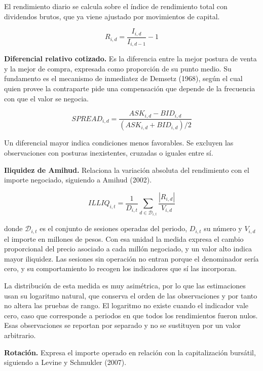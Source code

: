 El rendimiento diario se calcula sobre el índice de rendimiento total con dividendos brutos, que ya viene ajustado por movimientos de capital.

\begin{equation}R_{i,d} = \frac{I_{i,d}}{I_{i,d - 1}} - 1\tag{4}\end{equation}

\textbf{Diferencial relativo cotizado.} Es la diferencia entre la mejor postura de venta y la mejor de compra, expresada como proporción de su punto medio. Su fundamento es el mecanismo de inmediatez de Demsetz (1968), según el cual quien provee la contraparte pide una compensación que depende de la frecuencia con que el valor se negocia.

\begin{equation}SPREAD_{i,d} = \frac{ASK_{i,d} - BID_{i,d}}{\left( ASK_{i,d} + BID_{i,d} \right)/2}\tag{5}\end{equation}

Un diferencial mayor indica condiciones menos favorables. Se excluyen las observaciones con posturas inexistentes, cruzadas o iguales entre sí.

\textbf{Iliquidez de Amihud.} Relaciona la variación absoluta del rendimiento con el importe negociado, siguiendo a Amihud (2002).

\begin{equation}ILLIQ_{i,t} = \frac{1}{D_{i,t}}\sum_{d \in \mathcal{D}_{i,t}}^{}\frac{\left| R_{i,d} \right|}{V_{i,d}}\tag{6}\end{equation}

donde $\mathcal{D}_{i,t}$ es el conjunto de sesiones operadas del periodo, $D_{i,t}$ su número y $V_{i,d}$ el importe en millones de pesos. Con esa unidad la medida expresa el cambio proporcional del precio asociado a cada millón negociado, y un valor alto indica mayor iliquidez. Las sesiones sin operación no entran porque el denominador sería cero, y su comportamiento lo recogen los indicadores que sí las incorporan.

La distribución de esta medida es muy asimétrica, por lo que las estimaciones usan su logaritmo natural, que conserva el orden de las observaciones y por tanto no altera las pruebas de rango. El logaritmo no existe cuando el indicador vale cero, caso que corresponde a periodos en que todos los rendimientos fueron nulos. Esas observaciones se reportan por separado y no se sustituyen por un valor arbitrario.

\textbf{Rotación.} Expresa el importe operado en relación con la capitalización bursátil, siguiendo a Levine y Schmukler (2007).


